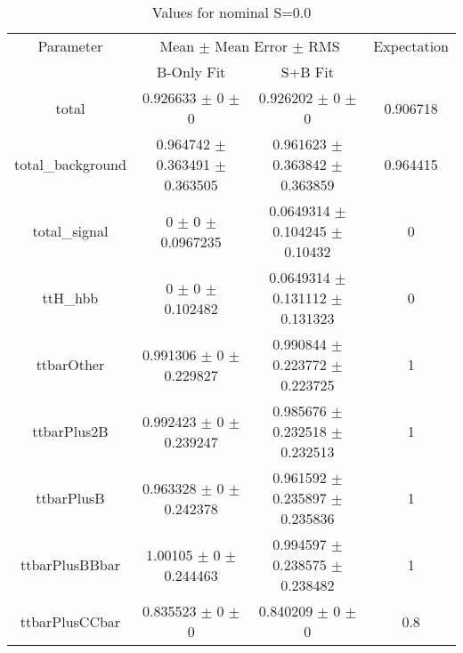 \begin{table}
\centering
\caption{Values for nominal S=0.0}
\begin{tabular}{cccc}
\toprule
Parameter & \multicolumn{2}{c}{Mean $\pm$ Mean Error $\pm$ RMS} & Expectation\\
 & B-Only Fit & S+B Fit & \\
\midrule
total & \num{0.926633} $\pm$ \num{0} $\pm$ \num{0} & \num{0.926202} $\pm$ \num{0} $\pm$ \num{0} & \num{0.906718}\\
total\_background & \num{0.964742} $\pm$ \num{0.363491} $\pm$ \num{0.363505} & \num{0.961623} $\pm$ \num{0.363842} $\pm$ \num{0.363859} & \num{0.964415}\\
total\_signal & \num{0} $\pm$ \num{0} $\pm$ \num{0.0967235} & \num{0.0649314} $\pm$ \num{0.104245} $\pm$ \num{0.10432} & \num{0}\\
ttH\_hbb & \num{0} $\pm$ \num{0} $\pm$ \num{0.102482} & \num{0.0649314} $\pm$ \num{0.131112} $\pm$ \num{0.131323} & \num{0}\\
ttbarOther & \num{0.991306} $\pm$ \num{0} $\pm$ \num{0.229827} & \num{0.990844} $\pm$ \num{0.223772} $\pm$ \num{0.223725} & \num{1}\\
ttbarPlus2B & \num{0.992423} $\pm$ \num{0} $\pm$ \num{0.239247} & \num{0.985676} $\pm$ \num{0.232518} $\pm$ \num{0.232513} & \num{1}\\
ttbarPlusB & \num{0.963328} $\pm$ \num{0} $\pm$ \num{0.242378} & \num{0.961592} $\pm$ \num{0.235897} $\pm$ \num{0.235836} & \num{1}\\
ttbarPlusBBbar & \num{1.00105} $\pm$ \num{0} $\pm$ \num{0.244463} & \num{0.994597} $\pm$ \num{0.238575} $\pm$ \num{0.238482} & \num{1}\\
ttbarPlusCCbar & \num{0.835523} $\pm$ \num{0} $\pm$ \num{0} & \num{0.840209} $\pm$ \num{0} $\pm$ \num{0} & \num{0.8}\\
\bottomrule
\end{tabular}
\end{table}